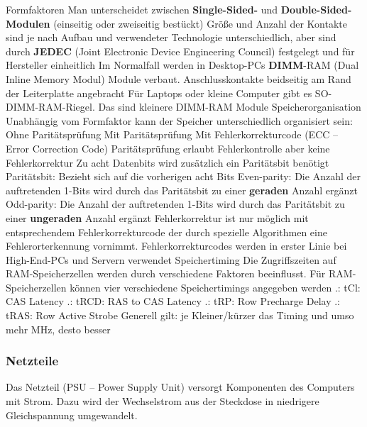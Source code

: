 \documentclass[10pt]{article}
\begin{document}
\begin{flushleft}
\begin{outline}
    \1 Formfaktoren
        \2 Man unterscheidet zwischen \textbf{Single-Sided-} und \textbf{Double-Sided-Modulen} (einseitig oder zweiseitig bestückt)
        \2 Größe und Anzahl der Kontakte sind je nach Aufbau und verwendeter Technologie unterschiedlich, aber sind durch \textbf{JEDEC} (Joint Electronic Device Engineering Council) festgelegt und für Hersteller einheitlich
        \2 Im Normalfall werden in Desktop-PCs \textbf{DIMM}-RAM (Dual Inline Memory Modul) Module verbaut. Anschlusskontakte beidseitig am Rand der Leiterplatte angebracht
        \2 Für Laptops oder kleine Computer gibt es SO-DIMM-RAM-Riegel. Das sind kleinere DIMM-RAM Module
    \1 Speicherorganisation
        \2 Unabhängig vom Formfaktor kann der Speicher unterschiedlich organisiert sein:
            \3 Ohne Paritätsprüfung
            \3 Mit Paritätsprüfung
            \3 Mit Fehlerkorrekturcode (ECC – Error Correction Code)
        \2 Paritätsprüfung erlaubt Fehlerkontrolle aber keine Fehlerkorrektur
        \2 Zu acht Datenbits wird zusätzlich ein Paritätsbit benötigt
        \2 Paritätsbit:
            \3 Bezieht sich auf die vorherigen acht Bits
            \3 Even-parity: Die Anzahl der auftretenden 1-Bits wird durch das Paritätsbit zu einer \textbf{geraden} Anzahl ergänzt
            \3 Odd-parity: Die Anzahl der auftretenden 1-Bits wird durch das Paritätsbit zu einer \textbf{ungeraden} Anzahl ergänzt
        \2 Fehlerkorrektur ist nur möglich mit entsprechendem Fehlerkorrekturcode der durch spezielle Algorithmen eine Fehlerorterkennung vornimmt.
        \2 Fehlerkorrekturcodes werden in erster Linie bei High-End-PCs und Servern verwendet
    \1 Speichertiming
        \2 Die Zugriffszeiten auf RAM-Speicherzellen werden durch verschiedene Faktoren beeinflusst. Für RAM-Speicherzellen können vier verschiedene Speichertimings angegeben werden
        .: tCl: CAS Latency
        .: tRCD: RAS to CAS Latency
        .: tRP: Row Precharge Delay
        .: tRAS: Row Active Strobe
        \2 Generell gilt: je Kleiner/kürzer das Timing und umso mehr MHz, desto besser
\end{outline}

\break

\subsubsection{Netzteile}

Das Netzteil (PSU – Power Supply Unit) versorgt Komponenten des Computers mit Strom. Dazu wird der Wechselstrom aus der Steckdose in niedrigere Gleichspannung umgewandelt.


\end{flushleft}
\end{document}
